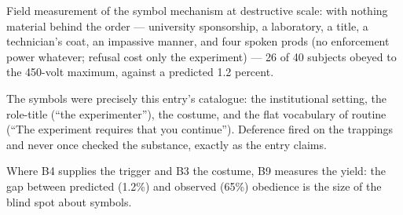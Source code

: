 

\begin{distilled}
  \item Field measurement of the symbol mechanism at destructive scale: with nothing material behind the order --- university sponsorship, a laboratory, a title, a technician's coat, an impassive manner, and four spoken prods (no enforcement power whatever; refusal cost only the experiment) --- 26 of 40 subjects obeyed to the 450-volt maximum, against a predicted 1.2 percent.
  \item The symbols were precisely this entry's catalogue: the institutional setting, the role-title (``the experimenter''), the costume, and the flat vocabulary of routine (``The experiment requires that you continue''). Deference fired on the trappings and never once checked the substance, exactly as the entry claims.
  \item Where B4 supplies the trigger and B3 the costume, B9 measures the yield: the gap between predicted (1.2\%) and observed (65\%) obedience is the size of the blind spot about symbols.
\end{distilled}

